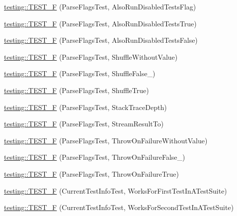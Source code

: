 \begin{DoxyCompactItemize}
\item 
\mbox{\hyperlink{namespacetesting_a579ed858a912b7fd5ff7b68f3c0d9184}{testing\+::\+T\+E\+S\+T\+\_\+F}} (Parse\+Flags\+Test, Also\+Run\+Disabled\+Tests\+Flag)
\item 
\mbox{\hyperlink{namespacetesting_accb8f0a859dab6088b9429bf6fb3e1ac}{testing\+::\+T\+E\+S\+T\+\_\+F}} (Parse\+Flags\+Test, Also\+Run\+Disabled\+Tests\+True)
\item 
\mbox{\hyperlink{namespacetesting_afde27ba975e4a485af64de4c37dcbb98}{testing\+::\+T\+E\+S\+T\+\_\+F}} (Parse\+Flags\+Test, Also\+Run\+Disabled\+Tests\+False)
\item 
\mbox{\hyperlink{namespacetesting_a23373676b5605f4446444568b03851c1}{testing\+::\+T\+E\+S\+T\+\_\+F}} (Parse\+Flags\+Test, Shuffle\+Without\+Value)
\item 
\mbox{\hyperlink{namespacetesting_ac510159c0bac8ecf77e0d3884569b314}{testing\+::\+T\+E\+S\+T\+\_\+F}} (Parse\+Flags\+Test, Shuffle\+False\+\_)
\item 
\mbox{\hyperlink{namespacetesting_a11ba77d82075e6b72cc2cc3a0568eb4b}{testing\+::\+T\+E\+S\+T\+\_\+F}} (Parse\+Flags\+Test, Shuffle\+True)
\item 
\mbox{\hyperlink{namespacetesting_a1061c3a0db32c0706e9beba39c4d4324}{testing\+::\+T\+E\+S\+T\+\_\+F}} (Parse\+Flags\+Test, Stack\+Trace\+Depth)
\item 
\mbox{\hyperlink{namespacetesting_aa4c92d2a72b78b58c0bf7f59fc2be6d6}{testing\+::\+T\+E\+S\+T\+\_\+F}} (Parse\+Flags\+Test, Stream\+Result\+To)
\item 
\mbox{\hyperlink{namespacetesting_a1b96e71b9d6bde57bb5f7536961b5076}{testing\+::\+T\+E\+S\+T\+\_\+F}} (Parse\+Flags\+Test, Throw\+On\+Failure\+Without\+Value)
\item 
\mbox{\hyperlink{namespacetesting_a1b5b5c2e1f15ff13cad4ac7d5415f271}{testing\+::\+T\+E\+S\+T\+\_\+F}} (Parse\+Flags\+Test, Throw\+On\+Failure\+False\+\_)
\item 
\mbox{\hyperlink{namespacetesting_a439e3e79125f5222ddd95b8036252061}{testing\+::\+T\+E\+S\+T\+\_\+F}} (Parse\+Flags\+Test, Throw\+On\+Failure\+True)
\item 
\mbox{\hyperlink{namespacetesting_aa98ab448e05f39e83f5d40c1597cf6f1}{testing\+::\+T\+E\+S\+T\+\_\+F}} (Current\+Test\+Info\+Test, Works\+For\+First\+Test\+In\+A\+Test\+Suite)
\item 
\mbox{\hyperlink{namespacetesting_accb82db6202dbbc79a9597ea5d5ff234}{testing\+::\+T\+E\+S\+T\+\_\+F}} (Current\+Test\+Info\+Test, Works\+For\+Second\+Test\+In\+A\+Test\+Suite)

\end{DoxyCompactItemize}
